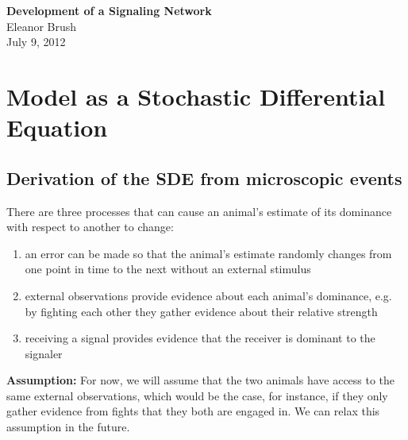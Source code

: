 \documentclass{article}
\begin{document}
\begin{center}
\Large

\end{center}


\vspace{0pt}

\begin{center}
{\bf \LARGE{Development of a Signaling Network}}
\vspace{10pt}
\\ Eleanor Brush
\\ July 9, 2012
\end{center}


\vspace{0pt}
\normalsize
\section{Model as a Stochastic Differential Equation}

\subsection{Derivation of the SDE from microscopic events }
There are three processes that can cause an animal's estimate of its dominance with respect to another to change:
\begin{enumerate}
\item an error can be made so that the animal's estimate randomly changes from one point in time to the next without an external stimulus

\item external observations provide evidence about each animal's dominance, e.g. by fighting each other they gather evidence about their relative strength

\item receiving a signal provides evidence that the receiver is dominant to the signaler

\end{enumerate}
{\bf Assumption:} For now, we will assume that the two animals have access to the same external observations, which would be the case, for instance, if they only gather evidence from fights that they both are engaged in.  We can relax this assumption in the future.
\end{document}
